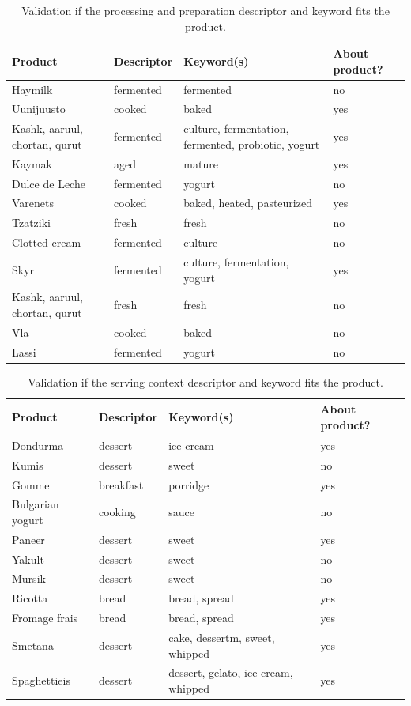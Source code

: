 \documentclass[sigconf]{acmart-txmm}
\begin{document}
\begin{table}[h]
  \centering
  \caption{Validation if the processing and preparation descriptor and keyword fits the product.}
  \label{tab:val_processing}
  \begin{tabular}{llll}
    \toprule
    \textbf{Product} & \textbf{Descriptor} & \textbf{Keyword(s)} & \textbf{About product?} \\
    \midrule
    Haymilk & fermented & fermented & no \\
    Uunijuusto & cooked & baked & yes \\
    Kashk, aaruul, chortan, qurut & fermented & culture, fermentation, fermented, probiotic, yogurt & yes \\
    Kaymak & aged & mature & yes \\
    Dulce de Leche & fermented & yogurt & no \\
    Varenets & cooked & baked, heated, pasteurized & yes \\
    Tzatziki & fresh & fresh & no \\
    Clotted cream & fermented & culture & no \\
    Skyr & fermented & culture, fermentation, yogurt & yes \\
    Kashk, aaruul, chortan, qurut & fresh & fresh & no \\
    Vla & cooked & baked & no \\
    Lassi & fermented & yogurt & no \\
    \bottomrule
  \end{tabular}
\end{table}

\begin{table}[h]
  \centering
  \caption{Validation if the serving context descriptor and keyword fits the product.}
  \label{tab:val_serving}
  \begin{tabular}{llll}
    \toprule
    \textbf{Product} & \textbf{Descriptor} & \textbf{Keyword(s)} & \textbf{About product?} \\
    \midrule
    Dondurma & dessert & ice cream & yes \\
    Kumis & dessert & sweet & no \\
    Gomme & breakfast & porridge & yes \\
    Bulgarian yogurt & cooking & sauce & no \\
    Paneer & dessert & sweet & yes \\
    Yakult & dessert & sweet & no \\
    Mursik & dessert & sweet & no \\
    Ricotta & bread & bread, spread & yes \\
    Fromage frais & bread & bread, spread & yes \\
    Smetana & dessert & cake, dessertm, sweet, whipped & yes \\
    Spaghettieis & dessert & dessert, gelato, ice cream, whipped & yes \\
    \bottomrule
  \end{tabular}
\end{table}
\end{document}
